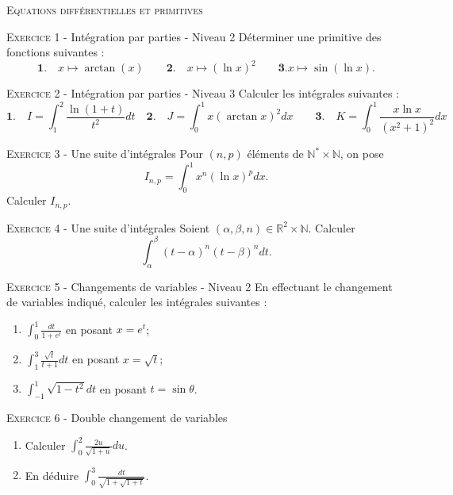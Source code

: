 \documentclass[11pt]{article}
\begin{document}
 

\begin{center}\textsc{{\huge Equations différentielles et primitives}}\end{center}



\vskip0.3cm\noindent\textsc{Exercice 1} - Intégration par parties - Niveau 2
\vskip0.2cm
Déterminer une primitive des fonctions suivantes :
$$\mathbf{1.}\quad x\mapsto\arctan(x)\quad\quad\mathbf{2.}\quad x\mapsto (\ln x)^2\quad\quad\mathbf{3.} x\mapsto \sin(\ln x).$$




\vskip0.3cm\noindent\textsc{Exercice 2} - Intégration par parties - Niveau 3
\vskip0.2cm
Calculer les intégrales suivantes :
$$\mathbf{1.}\quad I=\int_1^2\frac{\ln(1+t)}{t^2}dt\quad \mathbf{2.}\quad J=\int_0^1 x(\arctan x)^2dx\quad\quad\mathbf{3.}\quad K=\int_0^1 \frac{x\ln x}{(x^2+1)^2}dx$$




\vskip0.3cm\noindent\textsc{Exercice 3} - Une suite d'intégrales
\vskip0.2cm
Pour $(n,p)$ éléments de $\mathbb N^*\times\mathbb N$, on pose 
$$I_{n,p}=\int_0^1 x^n (\ln x)^p dx.$$
Calculer $I_{n,p}$.





\vskip0.3cm\noindent\textsc{Exercice 4} - Une suite d'intégrales
\vskip0.2cm
Soient $(\alpha,\beta,n)\in\mathbb R^2\times\mathbb N$. Calculer
$$\int_\alpha^\beta(t-\alpha)^n (t-\beta)^n dt.$$




\vskip0.3cm\noindent\textsc{Exercice 5} - Changements de variables - Niveau 2
\vskip0.2cm
En effectuant le changement de variables indiqué, calculer les intégrales suivantes :
\begin{enumerate}
\item  $\displaystyle \int_0^1\frac{dt}{1+e^t}$ en posant $x=e^t$;
\item $\displaystyle \int_1^3\frac{\sqrt t}{t+1}dt$ en posant $x=\sqrt t$;
\item $\displaystyle \int_{-1}^1 \sqrt{1-t^2}dt$ en posant $t=\sin\theta$.
\end{enumerate}




\vskip0.3cm\noindent\textsc{Exercice 6} - Double changement de variables
\vskip0.2cm
\begin{enumerate}
\item Calculer $\displaystyle\int_0^2 \frac{2u}{\sqrt{1+u}}du$.
\item En déduire $\displaystyle \int_0^{3}\frac{dt}{\sqrt{1+\sqrt{1+t}}}$.
\end{enumerate}
\end{document}
